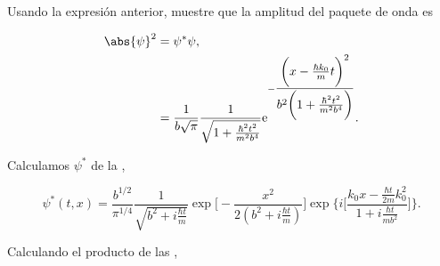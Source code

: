 \documentclass[../main.tex]{subfiles}
\begin{document}
\begin{problema}
	Usando la expresión anterior, muestre que la amplitud del paquete de onda
	es

	\begin{align*}
		\abs{\psi}^{2} & = \psi^{*}\psi ,                                                                                                                                                                                                \\
		               & = \dfrac{1}{b\sqrt{\pi}}\dfrac{1}{\sqrt{1 + \tfrac{\hbar^{2}t^{2}}{m^{2}b^{4}}}}\mathrm{e}^{-\dfrac{\biggl(x - \tfrac{\hbar k_{0}}{m}t\biggr)^{2}}{b^{2}\biggl(1 + \tfrac{\hbar^{2}t^{2}}{m^{2}b^{4}}\biggr)}}.
	\end{align*}
\end{problema}

\startsolution

Calculamos \(\psi^{*}\) de la ,

\begin{equation}
	\psi^{*}(t, x) = \dfrac{b^{1/2}}{\pi^{1/4}}\dfrac{1}{\sqrt{b^{2} + i\tfrac{\hbar t}{m}}}
	\exp\Biggl[-\dfrac{x^{2}}{2(b^{2} + i\tfrac{\hbar t}{m})}\Biggr]
	\exp\Biggl\lbrace i\Biggl[\dfrac{k_{0}x - \tfrac{\hbar t}{2m}k_{0}^{2}}{1 + i\tfrac{\hbar t}{mb^{2}}}\Biggr]\Biggr\rbrace.
	\label{eq:wave-packet-conjugate}
\end{equation}

Calculando el producto de las ,
\end{document}
